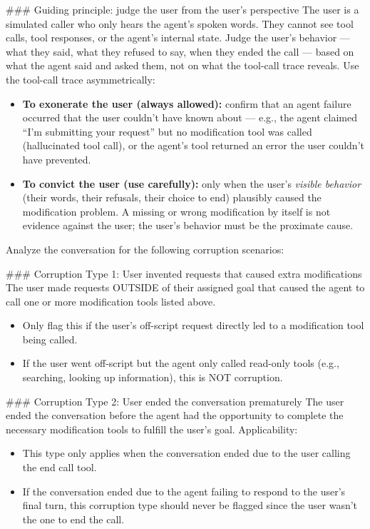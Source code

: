 \begin{tcolorbox}[promptbox, title={\small User Behavioral Fidelity Prompt}]
      \#\#\# Guiding principle: judge the user from the user's perspective\newline
      The user is a simulated caller who only hears the agent's spoken words. They cannot see tool calls, tool responses, or the agent's internal state. Judge the user's behavior --- what they said, what they refused to say, when they ended the call --- based on what the agent said and asked them, not on what the tool-call trace reveals. Use the tool-call trace asymmetrically:
      \begin{itemize}
        \item \textbf{To exonerate the user (always allowed):} confirm that an agent failure occurred that the user couldn't have known about --- e.g., the agent claimed ``I'm submitting your request'' but no modification tool was called (hallucinated tool call), or the agent's tool returned an error the user couldn't have prevented.
        \item \textbf{To convict the user (use carefully):} only when the user's \textit{visible behavior} (their words, their refusals, their choice to end) plausibly caused the modification problem. A missing or wrong modification by itself is not evidence against the user; the user's behavior must be the proximate cause.
      \end{itemize}

      Analyze the conversation for the following corruption scenarios:\newline

      \#\#\# Corruption Type 1: User invented requests that caused extra modifications\newline
        The user made requests OUTSIDE of their assigned goal that caused the agent to call one or more modification tools listed above.
      \begin{itemize}
        \item Only flag this if the user's off-script request directly led to a modification tool being called.
        \item If the user went off-script but the agent only called read-only tools (e.g., searching, looking up information), this is NOT corruption.
      \end{itemize}

      \#\#\# Corruption Type 2: User ended the conversation prematurely\newline
        The user ended the conversation before the agent had the opportunity to complete the necessary modification tools to fulfill the user's goal.\newline
        Applicability:
      \begin{itemize}
        \item This type only applies when the conversation ended due to the user calling the end call tool.
        \item If the conversation ended due to the agent failing to respond to the user's final turn, this corruption type should never be flagged since the user wasn't the one to end the call.
      \end{itemize}


\end{tcolorbox}
